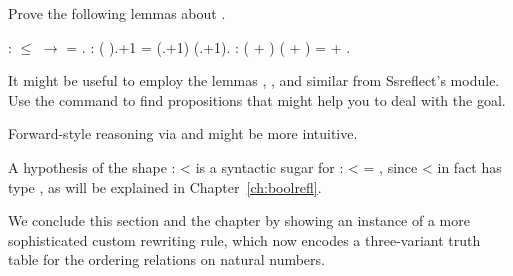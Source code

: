 \begin{exercise}\label{ex:maxn-props} 


Prove the following lemmas about .


\begin{coqdoccode}
\coqdocemptyline
\coqdocnoindent
{}   :  \ensuremath{\le}  \ensuremath{\rightarrow}    = .\coqdoceol
\coqdocemptyline
\coqdocnoindent
{}    : (  ).+1 =  (.+1) (.+1).\coqdoceol
\coqdocemptyline
\coqdocnoindent
{}    :  ( + ) ( + ) =  +   .\coqdoceol
\coqdocemptyline
\coqdocemptyline
\end{coqdoccode}


\hint It might be useful to employ the lemmas , ,
  and similar from Ssreflect's  
 module. Use the  command to find propositions that might help
 you to deal with the goal.


\hint Forward-style reasoning via  and  might be more
 intuitive.


\hint A hypothesis of the shape :  <  is a syntactic sugar for
 :  <  = , since  <  in fact has type , as will be
 explained in Chapter~\ref{ch:boolrefl}.



\end{exercise}



We conclude this section and the chapter by showing an instance of a
more sophisticated custom rewriting rule, which now encodes a
three-variant truth table for the ordering relations on natural
numbers.




